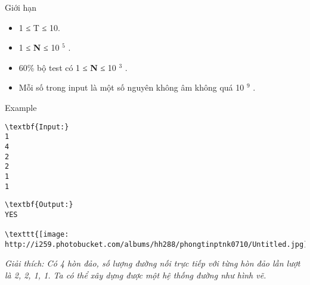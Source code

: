 Giới hạn
\begin{itemize}
	\item 1 ≤ T ≤ 10.
	\item 1 ≤ \textbf{ N } ≤ 10 $^ 5 $ .
	\item 60\% bộ test có 1 ≤ \textbf{ N } ≤ 10 $^ 3 $ .
	\item Mỗi số trong input là một số nguyên không âm không quá 10 $^ 9 $ .
\end{itemize}
Example
\begin{verbatim}
\textbf{Input:}
1
4
2
2
1
1\end{verbatim}
\begin{verbatim}
\textbf{Output:}
YES

\texttt{[image: http://i259.photobucket.com/albums/hh288/phongtinptnk0710/Untitled.jpg]}\end{verbatim}

\emph{Giải thích: Có 4 hòn đảo, số lượng đường nối trực tiếp với từng hòn đảo lần lượt là 2, 2, 1, 1. Ta có thể xây dựng được một hệ thống đường như hình vẽ. }